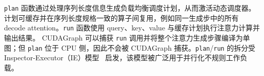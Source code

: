 \texttt{plan} 函数通过处理序列长度信息生成负载均衡调度计划，从而激活动态调度器。计划可缓存并在序列长度规格一致的算子间复用，例如同一生成步中的所有 decode attention。\texttt{run} 函数使用 query、key、value 与缓存计划执行注意力计算并输出结果。
CUDAGraph 可以捕获 \texttt{run} 调用并将整个注意力生成步骤编译为单图；但 \texttt{plan} 位于 CPU 侧，因此不会被 CUDAGraph 捕获。\texttt{plan}/\texttt{run} 的拆分受 Inspector-Executor（IE）模型~\cite{ravi1988principles, saltz1991preprocessed, ravi1993runtime} 启发，该模型被广泛用于并行化不规则工作负载。

